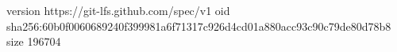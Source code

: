 version https://git-lfs.github.com/spec/v1
oid sha256:60b0f0060689240f399981a6f71317c926d4cd01a880acc93c90c79de80d78b8
size 196704
